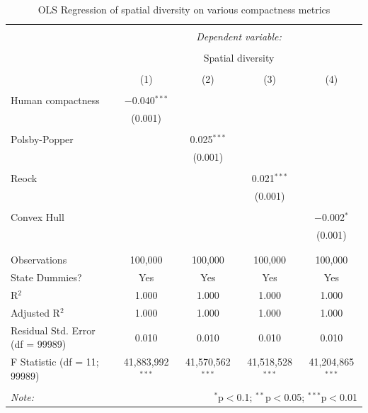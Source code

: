 \documentclass[]{article}
\begin{document}
\begin{table}[!htbp] \centering 
  \caption{OLS Regression of spatial diversity on various compactness metrics} 
  \label{table:ols_sd_hc} 
\begin{tabular}{@{\extracolsep{3pt}}lcccc} 
\\[-1.8ex]\hline 
\hline \\[-1.8ex] 
 & \multicolumn{4}{c}{\textit{Dependent variable:}} \\ 
\cline{2-5} 
\\[-1.8ex] & \multicolumn{4}{c}{Spatial diversity} \\ 
\\[-1.8ex] & (1) & (2) & (3) & (4)\\ 
\hline \\[-1.8ex] 
 Human compactness & $-$0.040$^{***}$ &  &  &  \\ 
  & (0.001) &  &  &  \\ 
  & & & & \\ 
 Polsby-Popper &  & 0.025$^{***}$ &  &  \\ 
  &  & (0.001) &  &  \\ 
  & & & & \\ 
 Reock &  &  & 0.021$^{***}$ &  \\ 
  &  &  & (0.001) &  \\ 
  & & & & \\ 
 Convex Hull &  &  &  & $-$0.002$^{*}$ \\ 
  &  &  &  & (0.001) \\ 
  & & & & \\ 
\hline \\[-1.8ex] 
Observations & 100,000 & 100,000 & 100,000 & 100,000 \\ 
State Dummies? & Yes & Yes & Yes & Yes \\ 
R$^{2}$ & 1.000 & 1.000 & 1.000 & 1.000 \\ 
Adjusted R$^{2}$ & 1.000 & 1.000 & 1.000 & 1.000 \\ 
Residual Std. Error (df = 99989) & 0.010 & 0.010 & 0.010 & 0.010 \\ 
F Statistic (df = 11; 99989) & 41,883,992$^{***}$ & 41,570,562$^{***}$ & 41,518,528$^{***}$ & 41,204,865$^{***}$ \\ 
\hline 
\hline \\[-1.8ex] 
\textit{Note:}  & \multicolumn{4}{r}{$^{*}$p$<$0.1; $^{**}$p$<$0.05; $^{***}$p$<$0.01} \\ 
\end{tabular} 
\end{table}
\end{document}
